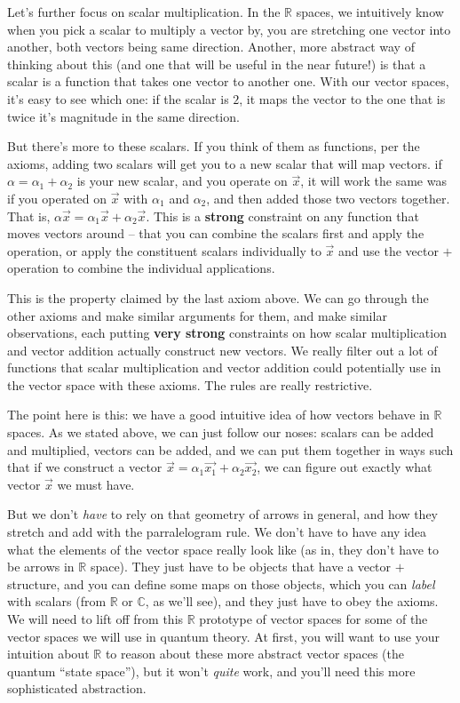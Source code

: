 \documentclass[
]{book}
\begin{document}
Let's further focus on scalar multiplication. In the \(\mathbb{R}\) spaces, we intuitively know when you pick a scalar to multiply a vector by, you are stretching one vector into another, both vectors being same direction. Another, more abstract way of thinking about this (and one that will be useful in the near future!) is that a scalar is a function that takes one vector to another one. With our vector spaces, it's easy to see which one: if the scalar is \(2\), it maps the vector to the one that is twice it's magnitude in the same direction.

But there's more to these scalars. If you think of them as functions, per the axioms, adding two scalars will get you to a new scalar that will map vectors. if \(\alpha = \alpha_{1} + \alpha_{2}\) is your new scalar, and you operate on \(\vec{x}\), it will work the same was if you operated on \(\vec{x}\) with \(\alpha_{1}\) and \(\alpha_{2}\), and then added those two vectors together. That is, \(\alpha \vec{x} = \alpha_{1} \vec{x} + \alpha_{2} \vec{x}\). This is a \textbf{strong} constraint on any function that moves vectors around -- that you can combine the scalars first and apply the operation, or apply the constituent scalars individually to \(\vec{x}\) and use the vector \(+\) operation to combine the individual applications.

This is the property claimed by the last axiom above. We can go through the other axioms and make similar arguments for them, and make similar observations, each putting \textbf{very strong} constraints on how scalar multiplication and vector addition actually construct new vectors. We really filter out a lot of functions that scalar multiplication and vector addition could potentially use in the vector space with these axioms. The rules are really restrictive.

The point here is this: we have a good intuitive idea of how vectors behave in \(\mathbb{R}\) spaces. As we stated above, we can just follow our noses: scalars can be added and multiplied, vectors can be added, and we can put them together in ways such that if we construct a vector \(\vec{x} = \alpha_{1} \vec{x_{1}} + \alpha_{2} \vec{x_{2}}\), we can figure out exactly what vector \(\vec{x}\) we must have.

But we don't \emph{have} to rely on that geometry of arrows in general, and how they stretch and add with the parralelogram rule. We don't have to have any idea what the elements of the vector space really look like (as in, they don't have to be arrows in \(\mathbb{R}\) space). They just have to be objects that have a vector \(+\) structure, and you can define some maps on those objects, which you can \emph{label} with scalars (from \(\mathbb{R}\) or \(\mathbb{C}\), as we'll see), and they just have to obey the axioms. We will need to lift off from this \(\mathbb{R}\) prototype of vector spaces for some of the vector spaces we will use in quantum theory. At first, you will want to use your intuition about \(\mathbb{R}\) to reason about these more abstract vector spaces (the quantum ``state space''), but it won't \emph{quite} work, and you'll need this more sophisticated abstraction.
\end{document}
